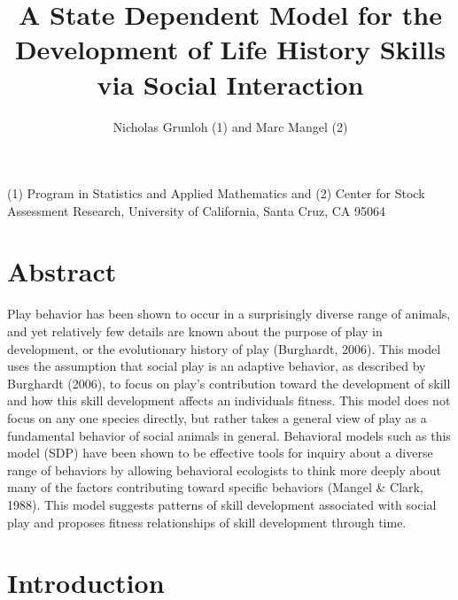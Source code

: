 \documentclass[12pt,letterpaper]{article}
\title{A State Dependent Model for the Development of Life History Skills via Social Interaction}
\author{Nicholas Grunloh (1) and Marc Mangel (2)}
\begin{document}
\maketitle
(1) Program in Statistics and Applied Mathematics and (2) Center for Stock Assessment Research, University of California, Santa Cruz, CA 95064
\section*{Abstract}
Play behavior has been shown to occur  in a surprisingly diverse range of animals, and yet relatively few details are known about the purpose of play in development, or the evolutionary history of play (Burghardt, 2006). %
  This model uses the assumption that social play is an adaptive behavior, as described by Burghardt (2006), to focus on play's contribution toward the development of skill and how this skill development affects an individuals fitness. %
  This model does not focus on any one species directly, but rather takes a general view of play as a fundamental behavior of social animals in general.
  Behavioral models such as this model (SDP) have been shown to be effective tools for inquiry about a diverse range of behaviors by allowing behavioral ecologists to think more deeply about many of the factors contributing toward specific behaviors (Mangel \& Clark, 1988). %
  This model suggests patterns of skill development associated with social play and proposes fitness relationships of skill development through time. 

\section{Introduction}
\end{document}
